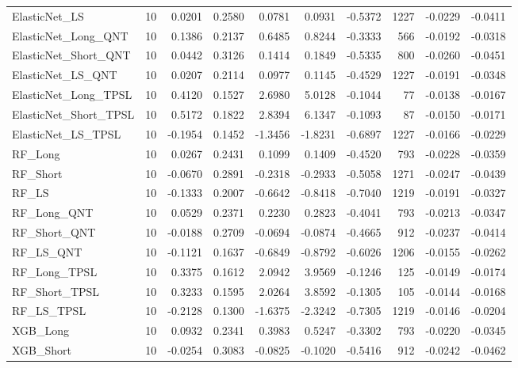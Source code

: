\begin{tabular}{llrrrrrrrr}
\cline{1-10}
ElasticNet\_LS & 10 & 0.0201 & 0.2580 & 0.0781 & 0.0931 & -0.5372 & 1227 & -0.0229 & -0.0411 \\
\cline{1-10}
ElasticNet\_Long\_QNT & 10 & 0.1386 & 0.2137 & 0.6485 & 0.8244 & -0.3333 & 566 & -0.0192 & -0.0318 \\
\cline{1-10}
ElasticNet\_Short\_QNT & 10 & 0.0442 & 0.3126 & 0.1414 & 0.1849 & -0.5335 & 800 & -0.0260 & -0.0451 \\
\cline{1-10}
ElasticNet\_LS\_QNT & 10 & 0.0207 & 0.2114 & 0.0977 & 0.1145 & -0.4529 & 1227 & -0.0191 & -0.0348 \\
\cline{1-10}
ElasticNet\_Long\_TPSL & 10 & 0.4120 & 0.1527 & 2.6980 & 5.0128 & -0.1044 & 77 & -0.0138 & -0.0167 \\
\cline{1-10}
ElasticNet\_Short\_TPSL & 10 & 0.5172 & 0.1822 & 2.8394 & 6.1347 & -0.1093 & 87 & -0.0150 & -0.0171 \\
\cline{1-10}
ElasticNet\_LS\_TPSL & 10 & -0.1954 & 0.1452 & -1.3456 & -1.8231 & -0.6897 & 1227 & -0.0166 & -0.0229 \\
\cline{1-10}
RF\_Long & 10 & 0.0267 & 0.2431 & 0.1099 & 0.1409 & -0.4520 & 793 & -0.0228 & -0.0359 \\
\cline{1-10}
RF\_Short & 10 & -0.0670 & 0.2891 & -0.2318 & -0.2933 & -0.5058 & 1271 & -0.0247 & -0.0439 \\
\cline{1-10}
RF\_LS & 10 & -0.1333 & 0.2007 & -0.6642 & -0.8418 & -0.7040 & 1219 & -0.0191 & -0.0327 \\
\cline{1-10}
RF\_Long\_QNT & 10 & 0.0529 & 0.2371 & 0.2230 & 0.2823 & -0.4041 & 793 & -0.0213 & -0.0347 \\
\cline{1-10}
RF\_Short\_QNT & 10 & -0.0188 & 0.2709 & -0.0694 & -0.0874 & -0.4665 & 912 & -0.0237 & -0.0414 \\
\cline{1-10}
RF\_LS\_QNT & 10 & -0.1121 & 0.1637 & -0.6849 & -0.8792 & -0.6026 & 1206 & -0.0155 & -0.0262 \\
\cline{1-10}
RF\_Long\_TPSL & 10 & 0.3375 & 0.1612 & 2.0942 & 3.9569 & -0.1246 & 125 & -0.0149 & -0.0174 \\
\cline{1-10}
RF\_Short\_TPSL & 10 & 0.3233 & 0.1595 & 2.0264 & 3.8592 & -0.1305 & 105 & -0.0144 & -0.0168 \\
\cline{1-10}
RF\_LS\_TPSL & 10 & -0.2128 & 0.1300 & -1.6375 & -2.3242 & -0.7305 & 1219 & -0.0146 & -0.0204 \\
\cline{1-10}
XGB\_Long & 10 & 0.0932 & 0.2341 & 0.3983 & 0.5247 & -0.3302 & 793 & -0.0220 & -0.0345 \\
\cline{1-10}
XGB\_Short & 10 & -0.0254 & 0.3083 & -0.0825 & -0.1020 & -0.5416 & 912 & -0.0242 & -0.0462 \\

\end{tabular}
